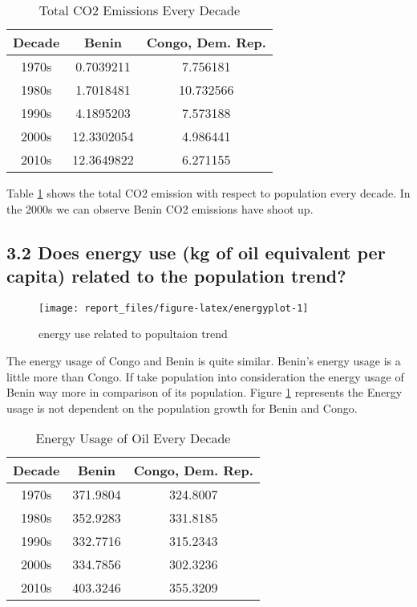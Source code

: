\documentclass[11pt,a4paper,]{article}
\begin{document}
\begin{table}[!h]

\caption{\label{tab:co2table}Total CO2 Emissions Every Decade}
\centering
\begin{tabular}[t]{ccc}
\toprule
Decade & Benin & Congo, Dem. Rep.\\
\midrule
1970s & 0.7039211 & 7.756181\\
1980s & 1.7018481 & 10.732566\\
1990s & 4.1895203 & 7.573188\\
2000s & 12.3302054 & 4.986441\\
2010s & 12.3649822 & 6.271155\\
\bottomrule
\end{tabular}
\end{table}

Table \ref{tab:co2table} shows the total CO2 emission with respect to population every decade. In the 2000s we can observe Benin CO2 emissions have shoot up.

\subsection*{3.2 Does energy use (kg of oil equivalent per capita) related to the population trend?}

\begin{figure}[!h]

{\centering \texttt{[image: report\_files/figure-latex/energyplot-1]} 

}

\caption{energy use related to popultaion trend}\label{fig:energyplot}
\end{figure}

The energy usage of Congo and Benin is quite similar. Benin's energy usage is a little more than Congo.
If take population into consideration the energy usage of Benin way more in comparison of its population.
Figure \ref{fig:energyplot} represents the Energy usage is not dependent on the population growth for Benin and Congo.

\begin{table}[!h]

\caption{\label{tab:energytable}Energy Usage of Oil Every Decade}
\centering
\begin{tabular}[t]{ccc}
\toprule
Decade & Benin & Congo, Dem. Rep.\\
\midrule
1970s & 371.9804 & 324.8007\\
1980s & 352.9283 & 331.8185\\
1990s & 332.7716 & 315.2343\\
2000s & 334.7856 & 302.3236\\
2010s & 403.3246 & 355.3209\\
\bottomrule
\end{tabular}
\end{table}
\end{document}
